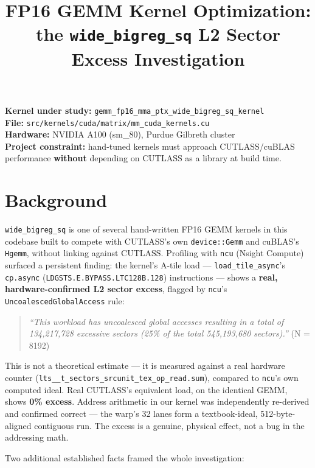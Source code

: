 \documentclass[11pt]{article}
\title{FP16 GEMM Kernel Optimization:\\the \texttt{wide\_bigreg\_sq} L2 Sector Excess Investigation}
\author{}
\date{}
\begin{document}
\maketitle

\noindent
\textbf{Kernel under study:} \texttt{gemm\_fp16\_mma\_ptx\_wide\_bigreg\_sq\_kernel}\\
\textbf{File:} \texttt{src/kernels/cuda/matrix/mm\_cuda\_kernels.cu}\\
\textbf{Hardware:} NVIDIA A100 (sm\_80), Purdue Gilbreth cluster\\
\textbf{Project constraint:} hand-tuned kernels must approach CUTLASS/cuBLAS performance \textbf{without} depending on CUTLASS as a library at build time.

\section{Background}

\texttt{wide\_bigreg\_sq} is one of several hand-written FP16 GEMM kernels in this codebase built to compete with CUTLASS's own \texttt{device::Gemm} and cuBLAS's \texttt{Hgemm}, without linking against CUTLASS. Profiling with \texttt{ncu} (Nsight Compute) surfaced a persistent finding: the kernel's A-tile load --- \texttt{load\_tile\_async}'s \texttt{cp.async} (\texttt{LDGSTS.E.BYPASS.LTC128B.128}) instructions --- shows a \textbf{real, hardware-confirmed L2 sector excess}, flagged by \texttt{ncu}'s \texttt{UncoalescedGlobalAccess} rule:

\begin{quote}
\textit{``This workload has uncoalesced global accesses resulting in a total of 134{,}217{,}728 excessive sectors (25\% of the total 545{,}193{,}680 sectors).''} (N = 8192)
\end{quote}

This is not a theoretical estimate --- it is measured against a real hardware counter (\texttt{lts\_\_t\_sectors\_srcunit\_tex\_op\_read.sum}), compared to \texttt{ncu}'s own computed ideal. Real CUTLASS's equivalent load, on the identical GEMM, shows \textbf{0\% excess}. Address arithmetic in our kernel was independently re-derived and confirmed correct --- the warp's 32 lanes form a textbook-ideal, 512-byte-aligned contiguous run. The excess is a genuine, physical effect, not a bug in the addressing math.

Two additional established facts framed the whole investigation:
\end{document}
